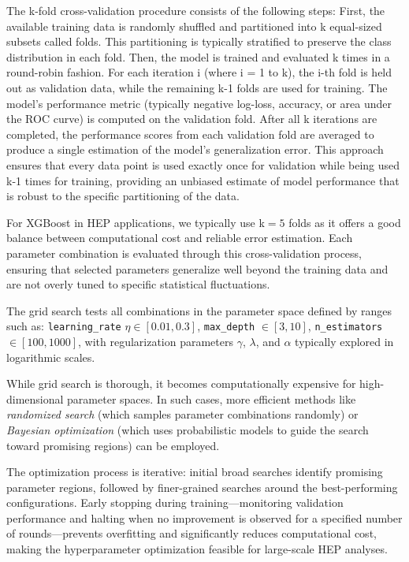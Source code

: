 The k-fold cross-validation procedure consists of the following steps: First, the available training data is randomly shuffled and partitioned into k equal-sized subsets called folds. This partitioning is typically stratified to preserve the class distribution in each fold. Then, the model is trained and evaluated k times in a round-robin fashion. For each iteration i (where i = 1 to k), the i-th fold is held out as validation data, while the remaining k-1 folds are used for training. The model's performance metric (typically negative log-loss, accuracy, or area under the ROC curve) is computed on the validation fold. After all k iterations are completed, the performance scores from each validation fold are averaged to produce a single estimation of the model's generalization error. This approach ensures that every data point is used exactly once for validation while being used k-1 times for training, providing an unbiased estimate of model performance that is robust to the specific partitioning of the data.


For XGBoost in HEP applications, we typically use k$=5$ folds as it offers a good balance between computational cost and reliable error estimation. Each parameter combination is evaluated through this cross-validation process, ensuring that selected parameters generalize well beyond the training data and are not overly tuned to specific statistical fluctuations.

The grid search tests all combinations in the parameter space defined by ranges such as: \texttt{learning\_rate} $\eta \in [0.01, 0.3]$, \texttt{max\_depth} $\in [3, 10]$, \texttt{n\_estimators} $\in [100, 1000]$, with regularization parameters $\gamma$, $\lambda$, and $\alpha$ typically explored in logarithmic scales.

While grid search is thorough, it becomes computationally expensive for high-dimensional parameter spaces. In such cases, more efficient methods like \textit{randomized search} (which samples parameter combinations randomly) or \textit{Bayesian optimization} (which uses probabilistic models to guide the search toward promising regions) can be employed. 

The optimization process is iterative: initial broad searches identify promising parameter regions, followed by finer-grained searches around the best-performing configurations. Early stopping during training—monitoring validation performance and halting when no improvement is observed for a specified number of rounds—prevents overfitting and significantly reduces computational cost, making the hyperparameter optimization feasible for large-scale HEP analyses.


